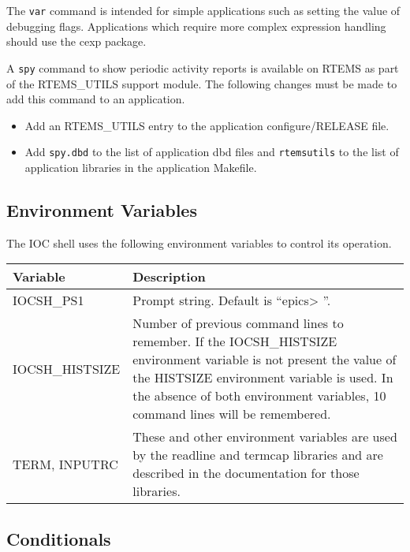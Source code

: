 The \verb|var| command is intended for simple applications such as setting the value of debugging flags.
Applications which require more complex expression handling should use the cexp package.

A \verb|spy| command to show periodic activity reports is available on RTEMS as part of the RTEMS\_UTILS support module.
The following changes must be made to add this command to an application.

\begin{itemize}
\item Add an RTEMS\_UTILS entry to the application configure/RELEASE file.

\item Add \verb|spy.dbd| to the list of application dbd files and \verb|rtemsutils| to the list of application libraries in the application Makefile.

\end{itemize}

\subsection{Environment Variables}

The IOC shell uses the following environment variables to control its operation.
\begin{center}
\begin{longtable}{p{1.305in}p{5.46in}}
Variable & Description\\
\hline
IOCSH\_PS1 & Prompt string. Default is ``epics\textgreater{} ''.\\
IOCSH\_HISTSIZE & Number of previous command lines to remember.
If the IOCSH\_HISTSIZE environment variable is not present the value of the HISTSIZE environment variable is used.
In the absence of both environment variables, 10 command lines will be remembered.\\
TERM, INPUTRC & These and other environment variables are used by the readline and termcap libraries and are described in the documentation for those libraries.
\end{longtable}

\end{center}

\subsection{Conditionals}

